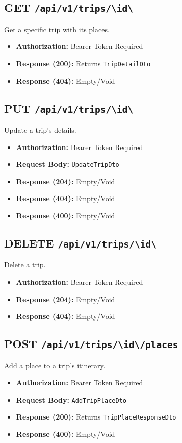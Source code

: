 \subsection{GET \texttt{/api/v1/trips/\textbackslash{}{id\textbackslash{}}}}
Get a specific trip with its places.
\begin{itemize}
    \item \textbf{Authorization:} Bearer Token Required
    \item \textbf{Response (200):} Returns \texttt{TripDetailDto}
    \item \textbf{Response (404):} Empty/Void
\end{itemize}

\subsection{PUT \texttt{/api/v1/trips/\textbackslash{}{id\textbackslash{}}}}
Update a trip's details.
\begin{itemize}
    \item \textbf{Authorization:} Bearer Token Required
    \item \textbf{Request Body:} \texttt{UpdateTripDto}
    \item \textbf{Response (204):} Empty/Void
    \item \textbf{Response (404):} Empty/Void
    \item \textbf{Response (400):} Empty/Void
\end{itemize}

\subsection{DELETE \texttt{/api/v1/trips/\textbackslash{}{id\textbackslash{}}}}
Delete a trip.
\begin{itemize}
    \item \textbf{Authorization:} Bearer Token Required
    \item \textbf{Response (204):} Empty/Void
    \item \textbf{Response (404):} Empty/Void
\end{itemize}

\subsection{POST \texttt{/api/v1/trips/\textbackslash{}{id\textbackslash{}}/places}}
Add a place to a trip's itinerary.
\begin{itemize}
    \item \textbf{Authorization:} Bearer Token Required
    \item \textbf{Request Body:} \texttt{AddTripPlaceDto}
    \item \textbf{Response (200):} Returns \texttt{TripPlaceResponseDto}
    \item \textbf{Response (400):} Empty/Void
\end{itemize}

